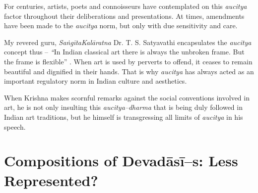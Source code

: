 For centuries, artists, poets and connoisseurs have contemplated on this \textit{aucitya} factor throughout their deliberations and presentations. At times, amendments have been made to the \textit{aucitya} norm, but only with due sensitivity and care.

My revered guru, \textit{Saṅgīta}\textit{Kalāratna} Dr. T. S. Satyavathi encapsulates the \textit{aucitya} concept thus – \textit{“}In Indian classical art there is always the unbroken frame. But the frame is flexible” . When art is used by perverts to offend, it ceases to remain beautiful and dignified in their hands. That is why \textit{aucitya} has always acted as an important regulatory norm in Indian culture and aesthetics.

When Krishna makes scornful remarks against the social conventions involved in art, he is not only insulting this \textit{aucitya–dharma} that is being duly followed in Indian art traditions, but he himself is transgressing all limits of \textit{aucitya} in his speech.


\section*{Compositions of Devadāsī–s: Less Represented?}

